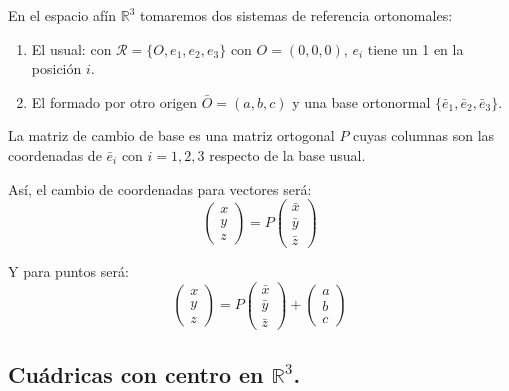 \documentclass[11pt, a4paper, titlepage]{article}
\newcommand{\R}{\mathbb{R}}
\theoremstyle{theorem-style}
\theoremstyle{definition-style}
\theoremstyle{remark-style}
\theoremstyle{example-style}
\newenvironment{nlist}
{\begin{enumerate}
    \renewcommand\labelenumi{(\emph{\roman{enumi})}}}
  {\end{enumerate}}
\begin{document}
En el espacio afín $\R^3$ tomaremos dos sistemas de referencia ortonomales:
\begin{nlist}
	\item El usual: con $\mathcal R = \{O, e_1, e_2, e_3\}$ con $O=(0,0,0)$, $e_i$ tiene un 1 en la posición $i$.
	\item El formado por otro origen $\bar O = (a,b,c)$ y una base ortonormal $\{\bar e_1, \bar e_2, \bar e_3\}$. 
\end{nlist}

La matriz de cambio de base es una matriz ortogonal $P$ cuyas columnas son las coordenadas de $\bar e_i$ con $i=1,2,3$ respecto de la base usual.

Así, el cambio de coordenadas para vectores será:
\[
\begin{pmatrix}
x\\
y\\
z
\end{pmatrix}  = P \begin{pmatrix}
\bar x\\
\bar y\\
\bar z
\end{pmatrix} 
\]

Y para puntos será:
\[
\begin{pmatrix}
x\\
y\\
z
\end{pmatrix} = P \begin{pmatrix}
\bar x\\
\bar y\\
\bar z
\end{pmatrix}  + \begin{pmatrix}
 a\\ 
 b\\
 c
\end{pmatrix} 
\]





\subsection{Cu\'adricas con centro en $\mathbb{R}^3$.}
\end{document}

